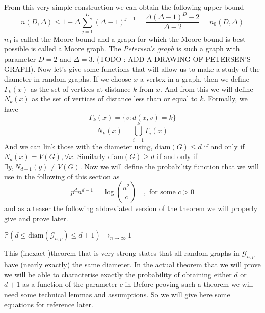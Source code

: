 From this very simple construction we can obtain the following upper bound
\begin{equation}
	n(D, \Delta) \leq 1 + \Delta \sum_{j=1}^{D}(\Delta - 1)^{j-1} = \frac{\Delta(\Delta - 1)^D - 2}{\Delta - 2} = n_0(D, \Delta)
\end{equation}
$n_0$ is called the Moore bound and a graph for which the Moore bound is best possible is called a Moore graph. 
The \emph{Petersen's graph} is such a graph with parameter $D= 2$ and $\Delta = 3$. (TODO : ADD A DRAWING OF PETERSEN'S GRAPH).
\newline
Now let's give some functions that will allow us to make a study of the diameter in random graphs. If we choose $x$ a vertex in a graph, then we define $\Gamma_k(x)$ as the set of vertices at distance $k$ from $x$. And from this we will define $N_k(x)$ as the set of vertices of distance less than or equal to $k$. 
Formally, we have
\begin{equation}
	\Gamma_k(x) = \{v : d(x, v) = k \}
\end{equation}
\begin{equation}
	N_k(x) = \bigcup_{i=1}^k \Gamma_i(x)
\end{equation}
And we can link those with the diameter using, diam$(G) \leq d $ if and only if $N_d(x) = V(G), \forall x$.
\newline
Similarly diam$(G) \geq d $ if and only if $\exists y, N_{d-1}(y) \neq V(G)$.
\newline
Now we will define the probability function that we will use in the following of this section as 
\begin{equation} \label{eq:pdiam}
	p^d n^{d-1} = \log(\frac{n^2}{c}) \quad, \text{  for some } c >0
\end{equation}
and as a teaser the following abbreviated version of the theorem we will properly give and prove later.
\begin{theorem}
	$\mathbb{P}(d \leq \text{diam}(\mathcal{G}_{n, p}) \leq d + 1) \longrightarrow_{n \to \infty} 1$
\end{theorem}
This (inexact )theorem that is very strong states that all random graphs in $\mathcal{G}_{n, p}$ have (nearly exactly) the same diameter.
In the actual theorem that we will prove we will be able to characterise exactly the probability of obtaining either $d$ or $d+1$ as a function of the parameter $c$ in \label{eq:diam}
\newline
Before proving such a theorem we will need some technical lemmas and assumptions. So we will give here some equations for reference later.
